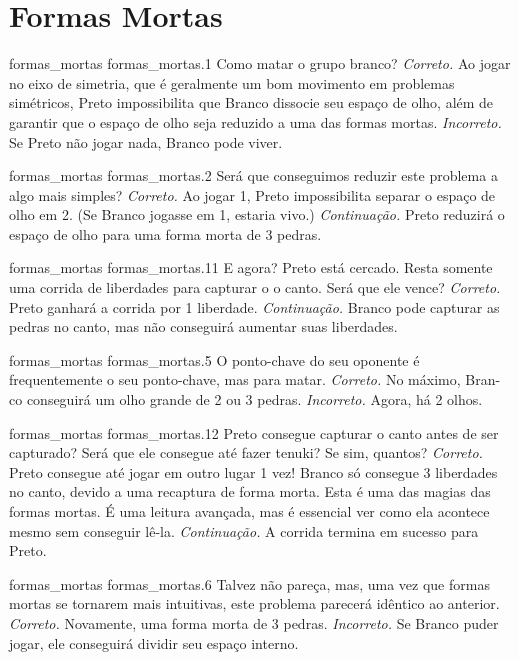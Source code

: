 \chapter{Formas Mortas}

\emptypage

\problemAnswerDiagram
  {formas_mortas}
  {formas_mortas.1}
  {Como matar o grupo branco?}
  {\emph{Correto.} Ao jogar no eixo de simetria, que é geralmente um bom movimento em problemas simétricos, Preto impossibilita que Branco dissocie seu espaço de olho, além de garantir que o espaço de olho seja reduzido a uma das formas mortas.}
  {\emph{Incorreto.} Se Preto não jogar nada, Branco pode viver.}

\problemAnswerDiagram
  {formas_mortas}
  {formas_mortas.2}
  {Será que conseguimos reduzir este problema a algo mais simples?}
  {\emph{Correto.} Ao jogar 1, Preto impossibilita separar o espaço de olho em 2. (Se Branco jogasse em 1, estaria vivo.)}
  {\emph{Continuação.} Preto reduzirá o espaço de olho para uma forma morta de 3 pedras.}

\problemAnswerDiagram
  {formas_mortas}
  {formas_mortas.11}
  {E agora? Preto está cercado. Resta somente uma corrida de liberdades para capturar o o canto. Será que ele vence?}
  {\emph{Correto.} Preto ganhará a corrida por 1 liberdade.}
  {\emph{Continuação.} Branco pode capturar as pedras no canto, mas não conseguirá aumentar suas liberdades.}

\problemAnswerDiagram
  {formas_mortas}
  {formas_mortas.5}
  {O ponto-chave do seu oponente é frequentemente o seu ponto-chave, mas para matar.}
  {\emph{Correto.} No máximo, Bran-co conseguirá um olho grande de 2 ou 3 pedras.}
  {\emph{Incorreto.} Agora, há 2 olhos.}

\problemAnswerDiagram
  {formas_mortas}
  {formas_mortas.12}
  {Preto consegue capturar o canto antes de ser capturado? Será que ele consegue até fazer tenuki? Se sim, quantos?}
  {\emph{Correto.} Preto consegue até jogar em outro lugar 1 vez! Branco só consegue 3 liberdades no canto, devido a uma recaptura de forma morta. Esta é uma das magias das formas mortas. É uma leitura avançada, mas é essencial ver como ela acontece mesmo sem conseguir lê-la.}
  {\emph{Continuação.} A corrida termina em sucesso para Preto.}

\problemAnswerDiagram
  {formas_mortas}
  {formas_mortas.6}
  {Talvez não pareça, mas, uma vez que formas mortas se tornarem mais intuitivas, este problema parecerá idêntico ao anterior.}
  {\emph{Correto.} Novamente, uma forma morta de 3 pedras.}
  {\emph{Incorreto.} Se Branco puder jogar, ele conseguirá dividir seu espaço interno.}

